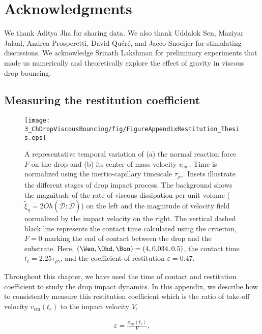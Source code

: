 \section*{Acknowledgments}
We thank Aditya Jha for sharing data. We also thank Uddalok Sen, Maziyar Jalaal, Andrea Prosperetti, David Qu{\'e}r{\'e}, and Jacco Snoeijer for stimulating discussions. We acknowledge Srinath Lakshman for preliminary experiments that made us numerically and theoretically explore the effect of gravity in viscous drop bouncing. 

\begin{subappendices}
	\section{Measuring the restitution coefficient}\label{app:restitution in simulations}
	
	\begin{sidewaysfigure}
		\centering
		\texttt{[image: 3\_ChDropViscousBouncing/fig/FigureAppendixRestitution\_Thesis.eps]}
		\caption{A representative temporal variation of (a) the normal reaction force $F$ on the drop and (b) its center of mass velocity $v_{\text{cm}}$. Time is normalized using the inertio-capillary timescale $\tau_{\rho\gamma}$. Insets illustrate the different stages of drop impact process. The background shows the magnitude of the rate of viscous dissipation per unit volume ($\tilde{\xi}_\eta = 2Oh\left(\boldsymbol{\tilde{\mathcal{D}}:\tilde{\mathcal{D}}}\right)$) on the left and the magnitude of velocity field normalized by the impact velocity on the right. The vertical dashed black line represents the contact time calculated using the criterion, $F = 0$ marking the end of contact between the drop and the substrate. Here, $\left(\Wen, \Ohd, \Bon\right) = \left(4, 0.034, 0.5\right)$, the contact time $t_c = 2.25\tau_{\rho\gamma}$, and the coefficient of restitution $\varepsilon = 0.47$.}
		\label{fig:AppendixRestitution}
	\end{sidewaysfigure}
	
	Throughout this chapter, we have used the time of contact and restitution coefficient to study the drop impact dynamics. In this appendix, we describe how to consistently measure this restitution coefficient which is the ratio of take-off velocity $v_{\text{cm}}(t_c)$ to the impact velocity $V$,
	
	\begin{align}
		\varepsilon = \frac{v_{\text{cm}}(t_c)}{V},
	\end{align}
	

\end{subappendices}
